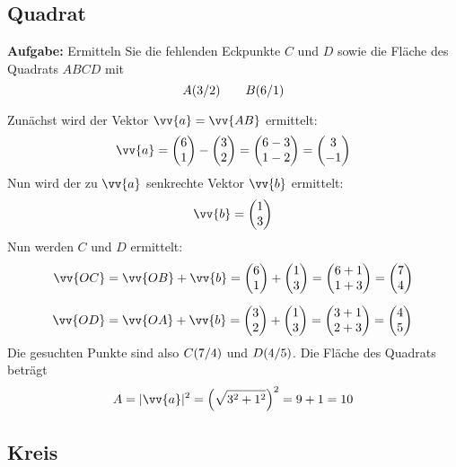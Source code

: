 \subsection{Quadrat}

\textbf{Aufgabe:} Ermitteln Sie die fehlenden Eckpunkte $C$ und $D$ sowie die Fläche des Quadrats $ABCD$ mit
\[
  \pxy[A]{3,2} \qquad \pxy[B]{6,1}
\]
\begin{center}
\end{center}
Zunächst wird der Vektor $\vv{a} = \vv{AB}$ ermittelt:
\[
  \vv{a} = \vxy{6,1}-\vxy{3,2} = \vxy{6-3,1-2} = \vxy{3,-1}
\]
Nun wird der zu $\vv{a}$ senkrechte Vektor $\vv{b}$ ermittelt:
\[
  \vv{b} = \vxy{1,3}
\]
Nun werden $C$ und $D$ ermittelt:
\begin{align*}
  \vv{OC} &= \vv{OB}+\vv{b} = \vxy{6,1} + \vxy{1,3} = \vxy{6+1,1+3} = \vxy{7,4} \\[2mm]
  \vv{OD} &= \vv{OA}+\vv{b} = \vxy{3,2} + \vxy{1,3} = \vxy{3+1,2+3} = \vxy{4,5}
\end{align*}
Die gesuchten Punkte sind also $\pxy[C]{7,4}$ und $\pxy[D]{4,5}$. Die Fläche des Quadrats beträgt
\[
  A = |\vv{a}|^{2} = \left(\sqrt{3^{2}+1^{2}}\right)^{2} = 9+1 = 10
\]

\newpage
\subsection{Kreis}

